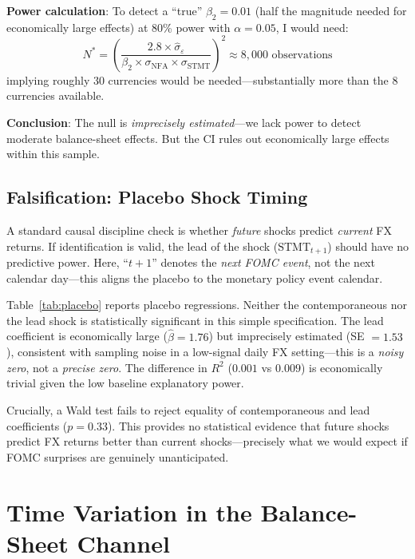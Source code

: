 \documentclass[12pt]{article}
\begin{document}
\textbf{Power calculation}: To detect a ``true'' $\beta_2 = 0.01$ (half the magnitude needed for economically large effects) at 80\% power with $\alpha = 0.05$, I would need:
\begin{equation}
N^* = \left(\frac{2.8 \times \hat{\sigma}_{\varepsilon}}{\beta_2 \times \sigma_{\text{NFA}} \times \sigma_{\text{STMT}}}\right)^2 \approx 8,000 \text{ observations}
\end{equation}
implying roughly 30 currencies would be needed---substantially more than the 8 currencies available.

\textbf{Conclusion}: The null is \textit{imprecisely estimated}---we lack power to detect moderate balance-sheet effects. But the CI rules out economically large effects within this sample.

\subsection{Falsification: Placebo Shock Timing}

A standard causal discipline check is whether \textit{future} shocks predict \textit{current} FX returns. If identification is valid, the lead of the shock ($\text{STMT}_{t+1}$) should have no predictive power. Here, ``$t+1$'' denotes the \textit{next FOMC event}, not the next calendar day---this aligns the placebo to the monetary policy event calendar.

Table~\ref{tab:placebo} reports placebo regressions. Neither the contemporaneous nor the lead shock is statistically significant in this simple specification. The lead coefficient is economically large ($\hat{\beta} = 1.76$) but imprecisely estimated (SE $= 1.53$), consistent with sampling noise in a low-signal daily FX setting---this is a \textit{noisy zero}, not a \textit{precise zero}. The difference in $R^2$ ($0.001$ vs $0.009$) is economically trivial given the low baseline explanatory power.

Crucially, a Wald test fails to reject equality of contemporaneous and lead coefficients ($p = 0.33$). This provides no statistical evidence that future shocks predict FX returns better than current shocks---precisely what we would expect if FOMC surprises are genuinely unanticipated.

\section{Time Variation in the Balance-Sheet Channel}
\label{sec:regimes}
\end{document}
